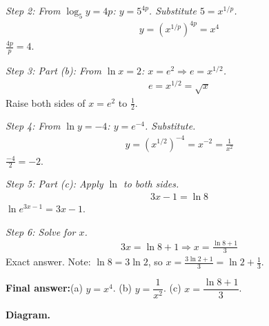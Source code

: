\documentclass[11pt]{article}
\begin{document}
\textit{Step 2: From \( \log_5 y = 4p \): \( y = 5^{4p} \). Substitute \( 5 = x^{1/p} \).}
\[\begin{gathered}
y = \left(x^{1/p}\right)^{4p} = x^4
\end{gathered}\]
\( \frac{4p}{p} = 4 \).

\textit{Step 3: Part (b): From \( \ln x = 2 \): \( x = e^2 \Rightarrow e = x^{1/2} \).}
\[\begin{gathered}
e = x^{1/2} = \sqrt{x}
\end{gathered}\]
Raise both sides of \( x = e^2 \) to \( \frac{1}{2} \).

\textit{Step 4: From \( \ln y = -4 \): \( y = e^{-4} \). Substitute.}
\[\begin{gathered}
y = \left(x^{1/2}\right)^{-4} = x^{-2} = \frac{1}{x^2}
\end{gathered}\]
\( \frac{-4}{2} = -2 \).

\textit{Step 5: Part (c): Apply \( \ln \) to both sides.}
\[\begin{gathered}
3x - 1 = \ln 8
\end{gathered}\]
\( \ln e^{3x-1} = 3x - 1 \).

\textit{Step 6: Solve for \( x \).}
\[\begin{gathered}
3x = \ln 8 + 1 \Rightarrow x = \frac{\ln 8 + 1}{3}
\end{gathered}\]
Exact answer. Note: \( \ln 8 = 3\ln 2 \), so \( x = \frac{3\ln 2 + 1}{3} = \ln 2 + \frac{1}{3} \).

\begin{answerbox}
\textbf{Final answer:}\quad (a) \(\displaystyle  y = x^4 \). (b) \(\displaystyle  y = \dfrac{1}{x^2} \). (c) \(\displaystyle  x = \dfrac{\ln 8 + 1}{3} \).
\end{answerbox}
\textbf{Diagram.}
\end{document}
